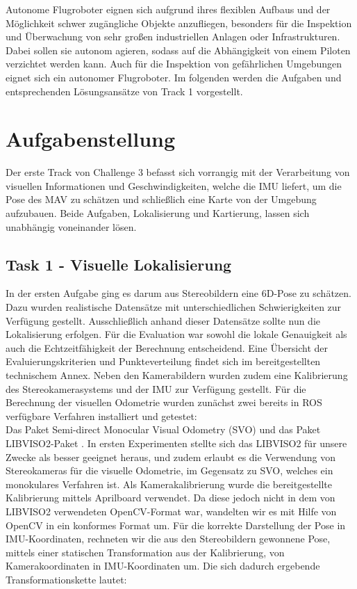 \documentclass[12pt,titlepage, a4paper]{article}
\begin{document}
Autonome Flugroboter eignen sich aufgrund ihres flexiblen Aufbaus und der Möglichkeit schwer zugängliche Objekte anzufliegen, besonders für die Inspektion und Überwachung von sehr großen industriellen
Anlagen oder Infrastrukturen. Dabei sollen sie autonom agieren, sodass auf die Abhängigkeit von einem Piloten verzichtet werden kann.
Auch für die Inspektion von gefährlichen Umgebungen eignet sich ein autonomer Flugroboter.
Im folgenden werden die Aufgaben und entsprechenden Lösungsansätze von Track 1 vorgestellt.





\section{Aufgabenstellung} 
Der erste Track von Challenge 3 befasst sich vorrangig mit der Verarbeitung von visuellen Informationen und Geschwindigkeiten, welche die IMU liefert, um die Pose des MAV zu schätzen
und schließlich eine Karte von der Umgebung aufzubauen. Beide Aufgaben, Lokalisierung und Kartierung, lassen sich unabhängig voneinander lösen.



\subsection{Task 1 - Visuelle Lokalisierung}
In der ersten Aufgabe ging es darum aus Stereobildern eine 6D-Pose zu schätzen. Dazu wurden realistische Datensätze mit unterschiedlichen Schwierigkeiten zur Verfügung gestellt.
Ausschließlich anhand dieser Datensätze sollte nun die Lokalisierung erfolgen. Für die Evaluation war sowohl die lokale Genauigkeit als auch die Echtzeitfähigkeit der Berechnung entscheidend.
Eine Übersicht der Evaluierungskriterien und Punkteverteilung findet sich im bereitgestellten technischem Annex\cite{eurocannex}.
Neben den Kamerabildern wurden zudem eine Kalibrierung des Stereokamerasystems und der IMU zur Verfügung gestellt. 
Für die Berechnung der visuellen Odometrie wurden zunächst zwei bereits in ROS verfügbare Verfahren installiert und getestet:\\
Das Paket Semi-direct Monocular Visual Odometry (SVO)\cite{EPFL-CONF-199740} und das Paket \mbox{LIBVISO2}-Paket \cite{Geiger11}.
In ersten Experimenten stellte sich das \mbox{LIBVISO2} für unsere Zwecke als besser geeignet heraus, und zudem erlaubt es die Verwendung von Stereokameras für die visuelle Odometrie, 
im Gegensatz zu SVO, welches ein monokulares Verfahren ist.
Als Kamerakalibrierung wurde die bereitgestellte Kalibrierung mittels Aprilboard verwendet. Da diese jedoch nicht in dem von \mbox{LIBVISO2} verwendeten OpenCV-Format war, wandelten wir es mit Hilfe von OpenCV
in ein konformes Format um.
Für die korrekte Darstellung der Pose in IMU-Koordinaten, rechneten wir die aus den Stereobildern gewonnene Pose, mittels einer statischen Transformation aus der Kalibrierung, von Kamerakoordinaten 
in IMU-Koordinaten um.
Die sich dadurch ergebende Transformationskette lautet:\\
\end{document}
